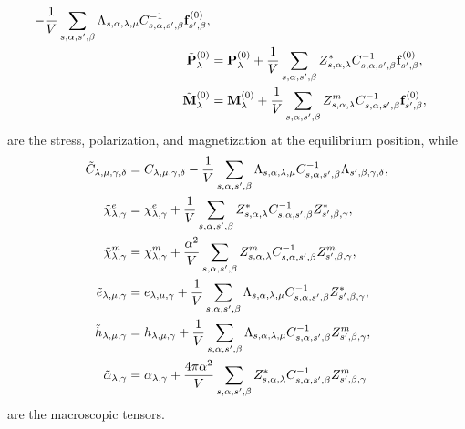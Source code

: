 \documentclass[12pt,a4paper]{article}
\begin{document}
{\begin{align}
-{1\over V} \sum_{s,\alpha,s',\beta} \Lambda_{s,\alpha,\lambda,\mu}
C^{-1}_{s,\alpha,s',\beta} {\bf f}^{(0)}_{s',\beta}, \\
\tilde {\bf P}^{(0)}_\lambda&= {\bf P}^{(0)}_\lambda +{1\over V}
\sum_{s,\alpha,s',\beta} Z^*_{s,\alpha,\lambda} C^{-1}_{s,\alpha,s',\beta}
{\bf f}^{(0)}_{s',\beta}, \\
\tilde {\bf M}^{(0)}_\lambda&= {\bf M}^{(0)}_\lambda +{1\over V}
\sum_{s,\alpha,s',\beta} Z^m_{s,\alpha,\lambda} C^{-1}_{s,\alpha,s',\beta}
{\bf f}^{(0)}_{s',\beta},
\end{align}
are the stress, polarization, and magnetization at the equilibrium position,
while
\begin{align}
\tilde C_{\lambda,\mu,\gamma,\delta}&= C_{\lambda,\mu,\gamma,\delta}
-{1\over V}\sum_{s,\alpha,s',\beta} \Lambda_{s,\alpha,\lambda,\mu}
C^{-1}_{s,\alpha,s',\beta}  \Lambda_{s',\beta,\gamma,\delta},\\
\tilde \chi^e_{\lambda,\gamma}&= \chi^e_{\lambda,\gamma} 
+{1 \over V} \sum_{s,\alpha,s',\beta} Z^*_{s,\alpha,\lambda}
C^{-1}_{s,\alpha,s',\beta}  Z^*_{s',\beta,\gamma},\\
\tilde \chi^m_{\lambda,\gamma}&= \chi^m_{\lambda,\gamma} 
+{\alpha^2 \over V} \sum_{s,\alpha,s',\beta} Z^m_{s,\alpha,\lambda}
C^{-1}_{s,\alpha,s',\beta}  Z^m_{s',\beta,\gamma}, \\
\tilde e_{\lambda,\mu,\gamma}&= e_{\lambda,\mu,\gamma}
+{1\over V}\sum_{s,\alpha,s',\beta} \Lambda_{s,\alpha,\lambda,\mu}
C^{-1}_{s,\alpha,s',\beta} Z^*_{s',\beta,\gamma},\\
\tilde h_{\lambda,\mu,\gamma}&= h_{\lambda,\mu,\gamma}
+{1\over V}\sum_{s,\alpha,s',\beta} \Lambda_{s,\alpha,\lambda,\mu}
C^{-1}_{s,\alpha,s',\beta}  Z^m_{s',\beta,\gamma},\\
\tilde \alpha_{\lambda,\gamma}&= \alpha_{\lambda,\gamma}
+{4 \pi \alpha^2 \over V}\sum_{s,\alpha,s',\beta} Z^*_{s,\alpha,\lambda}
C^{-1}_{s,\alpha,s',\beta}  Z^m_{s',\beta,\gamma}
\end{align}
are the macroscopic tensors.
}
\\
\end{document}
